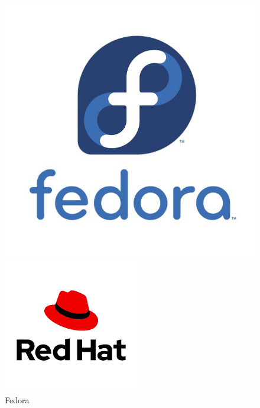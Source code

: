 \begin{itemize}[leftmargin=*,nosep]
\begin{figure}[hbt!]
\begin{minipage}[b]{0.18\textwidth}
    \includegraphics[width=\textwidth]{images_pfe/fedora.jpg}
    \caption{Fedora}
  \end{minipage}\hfill
  \begin{minipage}[b]{0.18\textwidth}
    \includegraphics[width=\textwidth]{images_pfe/redhat.png}

\end{minipage}
\end{figure}
\end{itemize}
